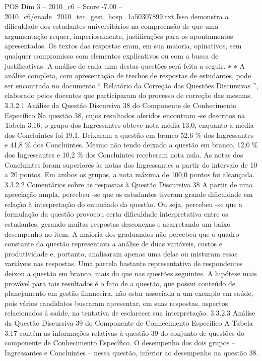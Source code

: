 \begin{textsample}{POS Dim 3 – 2010\_c6 – Score -7.00 – 2010\_c6/enade\_2010\_tec\_gest\_hosp\_1a50307899.txt}
Isso demonstra a dificuldade dos estudantes universitários na compreensão de que uma argumentação requer, imperiosamente, justificações para os apontamentos apresentados.
Os textos das respostas eram, em sua maioria, opinativos, sem qualquer compromisso com elementos explicativos ou com a busca de justificativas.
A análise de cada uma destas questões será feita a seguir. ∗ ∗ A análise completa, com apresentação de trechos de respostas de estudantes, pode ser encontrada no documento “ Relatório da Correção das Questões Discursivas ”, elaborado pelos docentes que participaram do processo de correção das mesmas. 3.3.2.1 Análise da Questão Discursiva 38 do Componente de Conhecimento Específico Na questão 38, cujos resultados aferidos encontram -se descritos na Tabela 3.16, o grupo dos Ingressantes obteve nota média 13,0, enquanto a média dos Concluintes foi 19,1.
Deixaram a questão em branco 52,6 \% dos Ingressantes e 41,8 \% dos Concluintes.
Mesmo não tendo deixado a questão em branco, 12,0 \% dos Ingressantes e 10,2 \% dos Concluintes receberam nota nula.
As notas dos Concluintes foram superiores às notas dos Ingressantes a partir do intervalo de 10 a 20 pontos.
Em ambos os grupos, a nota máxima de 100,0 pontos foi alcançada. 3.3.2.2 Comentários sobre as respostas à Questão Discursiva 38 A partir de uma apreciação ampla, percebeu -se que os estudantes tiveram grande dificuldade em relação à interpretação do enunciado da questão.
Ou seja, percebeu -se que a formulação da questão provocou certa dificuldade interpretativa entre os estudantes, gerando muitas respostas desconexas e acarretando um baixo desempenho no item.
A maioria dos graduandos não percebeu que o quadro constante da questão representava a análise de duas variáveis, custos e produtividade e, portanto, analisaram apenas uma delas ou misturam essas variáveis nas respostas.
Uma parcela bastante representativa de respondentes deixou a questão em branco, mais do que nas questões seguintes.
A hipótese mais provável para tais resultados é o fato de a questão, que possui conteúdo de planejamento em gestão financeira, não estar associada a um exemplo em saúde, pois vários candidatos buscaram apresentar, em suas respostas, aspectos relacionados à saúde, na tentativa de esclarecer sua interpretação. 3.3.2.3 Análise da Questão Discursiva 39 do Componente de Conhecimento Específico A Tabela 3.17 contém as informações relativas à questão 39 do conjunto de questões do componente de Conhecimento Específico.
O desempenho dos dois grupos – Ingressantes e Concluintes – nessa questão, inferior ao desempenho na questão 38.

\end{textsample}
